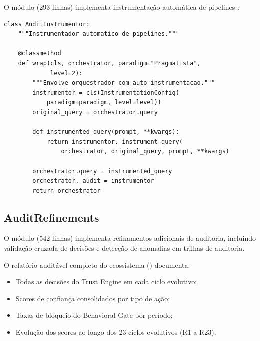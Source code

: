 O módulo  (293 linhas) implementa
instrumentação automática de pipelines \cite{opencode2026ecosystem}:

\begin{lstlisting}[style=pythonstyle, caption={AuditInstrumentor: auto-instrumentacao (audit\_instrumentor.py:51-112)}]
class AuditInstrumentor:
    """Instrumentador automatico de pipelines."""

    @classmethod
    def wrap(cls, orchestrator, paradigm="Pragmatista",
             level=2):
        """Envolve orquestrador com auto-instrumentacao."""
        instrumentor = cls(InstrumentationConfig(
            paradigm=paradigm, level=level))
        original_query = orchestrator.query

        def instrumented_query(prompt, **kwargs):
            return instrumentor._instrument_query(
                orchestrator, original_query, prompt, **kwargs)

        orchestrator.query = instrumented_query
        orchestrator._audit = instrumentor
        return orchestrator
\end{lstlisting}

\subsection{AuditRefinements}

O módulo  (542 linhas) implementa
refinamentos adicionais de auditoria, incluindo validação cruzada de
decisões e detecção de anomalias em trilhas de auditoria.

\begin{exemplo}
O relatório auditável completo do ecossistema
() documenta:
\begin{itemize}
\item Todas as decisões do Trust Engine em cada ciclo evolutivo;
\item Scores de confiança consolidados por tipo de ação;
\item Taxas de bloqueio do Behavioral Gate por período;
\item Evolução dos scores ao longo dos 23 ciclos evolutivos (R1 a R23).
\end{itemize}
\end{exemplo}

